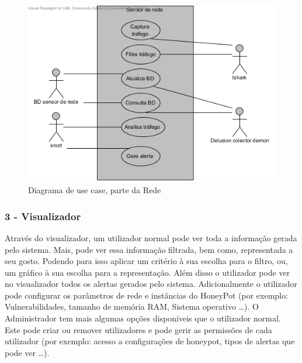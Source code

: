 \begin{figure}[!htb]
	\centering
	\includegraphics[scale=0.80]{images/ucs/Rede}
	\caption {Diagrama de use case, parte da Rede}
\end{figure}
\pagebreak




\subsubsection{\textbf{3 - Visualizador}}

Através do visualizador, um utilizador normal pode ver toda a informação gerada pelo sistema. Mais, pode ver essa informação filtrada, bem como,
representada a seu gosto. Podendo para isso aplicar um critério à sua escolha para o filtro, ou, um gráfico à sua escolha para a representação.
Além disso o utilizador pode ver no visualizador todos os alertas gerados pelo sistema. 
Adicionalmente o utilizador pode configurar os parâmetros de rede e instâncias do HoneyPot (por exemplo: Vulnerabilidades, tamanho de memória RAM,
Sistema operativo \ldots).
O Administrador tem mais algumas opções disponíveis que o utilizador normal. Este pode criar ou remover utilizadores e pode gerir as permissões de
cada utilizador (por exemplo: acesso a configurações de honeypot, tipos de alertas que pode ver \ldots).


